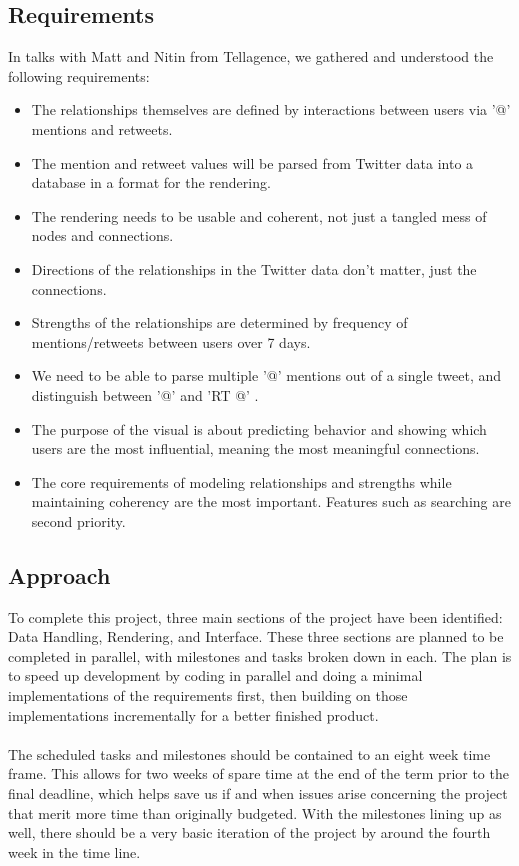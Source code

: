 \documentclass[12pt, letterpaper]{article}
\begin{document}
  \subsection{Requirements}
	In talks with Matt and Nitin from Tellagence, we gathered and understood the following requirements:
	\begin{itemize}
		\item The relationships themselves are defined by interactions between users via '@' mentions and retweets.
		\item The mention and retweet values will be parsed from Twitter data into a database in a format for the rendering.
		\item The rendering needs to be usable and coherent, not just a tangled mess of nodes and connections.
		\item Directions of the relationships in the Twitter data don't matter, just the connections.
		\item Strengths of the relationships are determined by frequency of mentions/retweets between users over 7 days.
		\item We need to be able to parse multiple '@' mentions out of a single tweet, and distinguish between '@' and 'RT @' .
		\item The purpose of the visual is about predicting behavior and showing which users are the most influential, meaning the most meaningful connections.
		\item The core requirements of modeling relationships and strengths while maintaining coherency are the most important. Features such as searching are second priority.
	\end{itemize}

  \subsection{Approach}
	To complete this project, three main sections of the project have been identified: Data Handling, Rendering, and Interface. These three sections are planned to be completed in parallel, with milestones and tasks broken down in each. The plan is to speed up development by coding in parallel and doing a minimal implementations of the requirements first, then building on those implementations incrementally for a better finished product.
	\\\\
	The scheduled tasks and milestones should be contained to an eight week time frame. This allows for two weeks of spare time at the end of the term prior to the final deadline, which helps save us if and when issues arise concerning the project that merit more time than originally budgeted. With the milestones lining up as well, there should be a very basic iteration of the project by around the fourth week in the time line.
\end{document}
